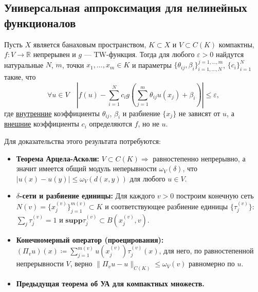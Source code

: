 \documentclass[../NDCNNAI_main.tex]{subfiles}
\begin{document}
\subsection{Универсальная аппроксимация для нелинейных функционалов}
\begin{theorem}
  \label{thm:uat_nonlin}
  Пусть $X$ является банаховым пространством, $K \subset X$ и $V \subset C(K)$ компактны, $f\colon V \to \mathbb{R}$ непрерывен и $g$ --- TW-функция.
  Тогда для любого $\varepsilon > 0$ найдутся натуральные $N$, $m$, точки $x_1, \dots, x_m \in K$ и параметры $\{\theta_{ij}, \beta_i\}_{i=1,\dots,N}^{j=1,\dots,m}$, $\{c_i\}_{i=1}^N$ такие, что
  $$\forall u \in V \quad \left|f(u) - \sum_{i=1}^N c_i g\left(\sum_{j=1}^m \theta_{ij} u(x_j) + \beta_i\right)\right| \le \varepsilon,$$
  где \underline{внутренние} коэффициенты $\theta_{ij}$, $\beta_i$ и разбиение $\{x_j\}$ не зависят от $u$, а \underline{внешние} коэффициенты $c_i$ определяются $f$, но не $u$.
\end{theorem}
Для доказательства этого результата потребуются:
\begin{itemize}
  \item \textbf{Теорема Арцела-Асколи:} $V \subset C(K) \Rightarrow$ равностепенно непрерывно, а значит имеется общий модуль неперывности $\omega_V(\delta)$, что $|u(x) - u(y)| \le \omega_V(d(x,y))$ для любого $u \in V$.
  \item \textbf{$\delta$-сети и разбиение единицы:} Для каждого $v > 0$ построим конечную сеть $N(v) = \{x_j^{(v)}\}_{j=1}^{m(v)} \subset K$ и соответствующее разбиение единицы $\{\tau_j^{(v)}\}$: $\sum_j \tau_j^{(v)} = 1$ и $\mathbf{supp}\tau_j^{(v)} \subset B\left(x_j^{(v)}, v\right)$.
  \item \textbf{Конечномерный оператор (проецирования):} $(\Pi_v u)(x) \coloneq \sum_{j=1}^{m(v)} u(x_j^{(v)}) \tau_j^{(v)}(x)$, для него, по равностепенной непрерывности $V$, верно $\|\Pi_v u - u\|_{C(K)} \le \omega_V(v)$ равномерно по $u$.
  \item \textbf{Предыдущая теорема об УА для компактных множеств.}
\end{itemize}
\end{document}
